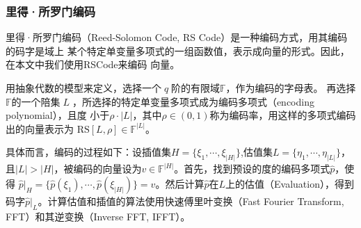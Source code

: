 \documentclass[zihao=-4]{ctexart}
\begin{document}
\subsubsection{里得·所罗门编码}
里得·所罗门编码\cite{Fourty-two}\cite{Eight}（Reed-Solomon Code, RS Code）是一种编码方式，用其编码的码字是域上
某个特定单变量多项式的一组函数值，表示成向量的形式。因此，在本文中我们使用RS\;Code来编码
向量。\par
用抽象代数的模型来定义，选择一个$\;q\;$阶的有限域$\mathbb{F}$，作为编码的字母表。
再选择$\mathbb{F}$的一个陪集$\;L\;$，所选择的特定单变量多项式成为编码多项式（encoding polynomial），且度
小于$\rho\cdot|L|$，其中$\rho\in(0,1)$称为编码率，用这样的多项式编码出的向量表示为
$\text{RS}[L,\rho]\in\mathbb{F}^{|L|}$。\par
具体而言，编码的过程如下：设插值集$H=\{\xi_1,\cdots,\xi_{|H|}\}$,估值集$L=\{\eta_1,\cdots,\eta_{|L|}\}$，
且$|L|>|H|$，被编码的向量设为$v\in\mathbb{F}^{|H|}$。首先，找到预设的度的编码多项式$\hat{p}$，使得
$\hat{p}|_H=\{\hat{p}(\xi_1),\cdots,\hat{p}(\xi_{|H|})\}=v$。然后计算$\hat{p}$在$L$上的估值（Evaluation），得到
码字$\hat{p}|_L$。计算估值和插值的算法使用快速傅里叶变换（Fast Fourier Transform, FFT）和其逆变换（Inverse FFT, IFFT）。
\end{document}
